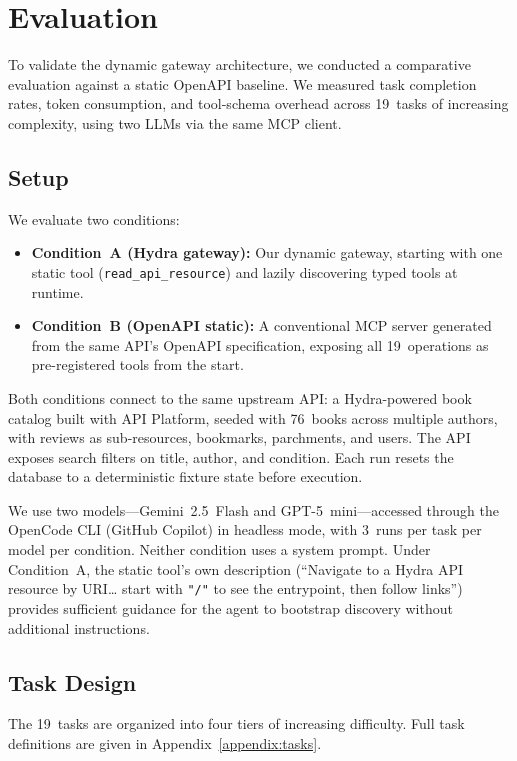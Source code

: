 \documentclass[11pt,a4paper]{article}
\begin{document}
\section{Evaluation}

To validate the dynamic gateway architecture, we conducted a comparative evaluation against a static OpenAPI baseline. We measured task completion rates, token consumption, and tool-schema overhead across 19~tasks of increasing complexity, using two LLMs via the same MCP client.

\subsection{Setup}

We evaluate two conditions:

\begin{itemize}
  \item \textbf{Condition~A (Hydra gateway):} Our dynamic gateway, starting with one static tool (\texttt{read\_api\_resource}) and lazily discovering typed tools at runtime.
  \item \textbf{Condition~B (OpenAPI static):} A conventional MCP server generated from the same API's OpenAPI specification, exposing all 19~operations as pre-registered tools from the start.
\end{itemize}

Both conditions connect to the same upstream API: a Hydra-powered book catalog built with API Platform, seeded with 76~books across multiple authors, with reviews as sub-resources, bookmarks, parchments, and users. The API exposes search filters on title, author, and condition. Each run resets the database to a deterministic fixture state before execution.

We use two models---Gemini~2.5~Flash and GPT-5~mini---accessed through the OpenCode CLI (GitHub Copilot) in headless mode, with 3~runs per task per model per condition. Neither condition uses a system prompt. Under Condition~A, the static tool's own description (``Navigate to a Hydra API resource by URI\ldots{} start with \texttt{"/"} to see the entrypoint, then follow links'') provides sufficient guidance for the agent to bootstrap discovery without additional instructions.

\subsection{Task Design}

The 19~tasks are organized into four tiers of increasing difficulty. Full task definitions are given in Appendix~\ref{appendix:tasks}.
\end{document}
